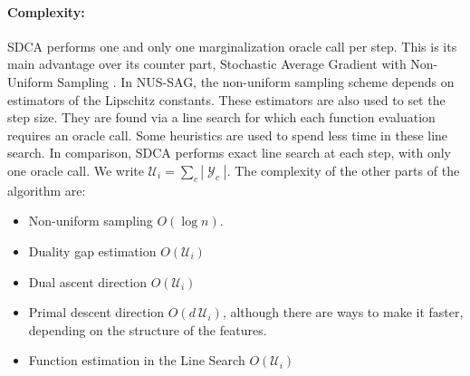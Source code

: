 \documentclass{article}
\DeclareMathOperator{\1}{\mathbb{1}}
\DeclareMathOperator{\Y}{\mathcal{Y}}
\begin{document}
\paragraph{Complexity:}
SDCA performs one and only one marginalization oracle call per step.
This is its main advantage over its counter part, Stochastic Average Gradient with Non-Uniform Sampling \cite{schmidt_non-uniform_2015}.
In NUS-SAG, the non-uniform sampling scheme depends on estimators of the Lipschitz constants.
These estimators are also used to set the step size.
They are found via a line search for which each function evaluation requires an oracle call.
Some heuristics are used to spend less time in these line search.
In comparison, SDCA performs exact line search at each step, with only one oracle call.
We write $\mathcal U_i = \sum_c |\Y_c|$. The complexity of the other parts of the algorithm are:
\begin{itemize}
	\item Non-uniform sampling $O(\log n)$.
	\item Duality gap estimation $O(\mathcal U_i)$
	\item Dual ascent direction $O(\mathcal U_i)$
	\item Primal descent direction $O(d \ \mathcal U_i)$, although there are ways to make it faster, depending on the structure of the features.
	\item Function estimation in the Line Search $O(\mathcal U_i)$
\end{itemize}



\end{document}
